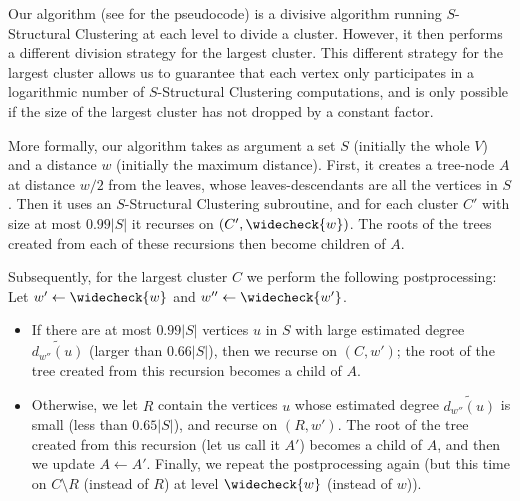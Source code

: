 \documentclass{article}
\begin{document}
Our algorithm (see  for the pseudocode) is a divisive algorithm running $S$-Structural Clustering at each level to divide a cluster.
However, it then performs a different division strategy for the largest cluster.
This different strategy for the largest cluster allows us to guarantee that each vertex only participates in a logarithmic number of $S$-Structural Clustering computations, and is only possible if the size of the largest cluster has not dropped by a constant factor.

More formally, our algorithm takes as argument a set $S$ (initially the whole $V$) and a distance $w$ (initially the maximum distance).
First, it creates a tree-node $A$ at distance $w/2$ from the leaves, whose leaves-descendants are all the vertices in $S$.
Then it uses an $S$-Structural Clustering subroutine, and for each cluster $C'$ with size at most $0.99|S|$ it recurses on $(C',\widecheck{w})$.
The roots of the trees created from each of these recursions then become children of $A$.

Subsequently, for the largest cluster $C$ we perform the following postprocessing:
Let $w' \gets \widecheck{w}$ and $w''\gets \widecheck{w'}$.
\begin{itemize}
    \item If there are at most $0.99|S|$ vertices $u$ in $S$ with large estimated degree $\widetilde{d_{w''}(u)}$ (larger than $0.66 |S|$), then we recurse on $(C,w')$; the root of the tree created from this recursion becomes a child of $A$.
    \item Otherwise, we let $R$ contain the vertices $u$ whose estimated degree $\widetilde{d_{w''}(u)}$ is small (less than $0.65 |S|$), and recurse on $(R,w')$.
    The root of the tree created from this recursion (let us call it $A'$) becomes a child of $A$, and then we update $A \gets A'$.
    Finally, we repeat the postprocessing again (but this time on $C\setminus R$ (instead of $R$) at level $\widecheck{w}$ (instead of $w$)).
\end{itemize}
\end{document}
